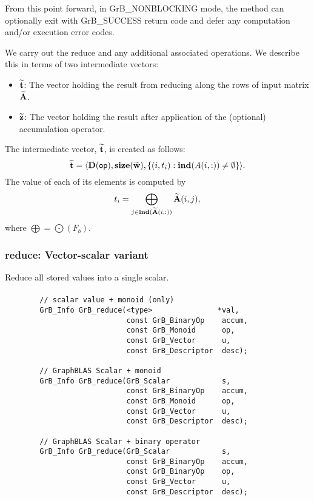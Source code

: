 From this point forward, in {\sf GrB\_NONBLOCKING} mode, the method can 
optionally exit with {\sf GrB\_SUCCESS} return code and defer any computation 
and/or execution error codes.

We carry out the reduce and any additional 
associated operations.  We describe this in terms of two intermediate vectors:
\begin{itemize}
    \item ${\bf \widetilde{t}}$: The vector holding the result from reducing along the rows of input matrix
    ${\bf \widetilde{A}}$.

    \item ${\bf \widetilde{z}}$: The vector holding the result after 
    application of the (optional) accumulation operator.
\end{itemize}

The intermediate vector, ${\bf \widetilde{t}}$, is created as follows:
\[
{\bf \widetilde{t}} = \langle
\bold{D}({\sf op}), \bold{size}({\bf \widetilde{w}}),
\{(i,t_i) : \bold{ind}(A(i,:)) \neq \emptyset   \} \rangle. 
\]
The value of each of its elements is computed by
\[
	t_i = \bigoplus_{j \in \bold{ind}({\bf \widetilde{A}}(i,:))} {\bf \widetilde{A}}(i,j), 
\]
where $\bigoplus = \bigodot(F_b)$.







\subsubsection{{\sf reduce}: Vector-scalar variant}
\label{Sec:Reduce_vector_scalar}

Reduce all stored values into a single scalar.

\paragraph{\syntax}

\begin{verbatim}
        // scalar value + monoid (only)
        GrB_Info GrB_reduce(<type>               *val,
                            const GrB_BinaryOp    accum,
                            const GrB_Monoid      op,
                            const GrB_Vector      u,
                            const GrB_Descriptor  desc);

        // GraphBLAS Scalar + monoid
        GrB_Info GrB_reduce(GrB_Scalar            s,
                            const GrB_BinaryOp    accum,
                            const GrB_Monoid      op,
                            const GrB_Vector      u,
                            const GrB_Descriptor  desc);

        // GraphBLAS Scalar + binary operator
        GrB_Info GrB_reduce(GrB_Scalar            s,
                            const GrB_BinaryOp    accum,
                            const GrB_BinaryOp    op,
                            const GrB_Vector      u,
                            const GrB_Descriptor  desc);
\end{verbatim}

